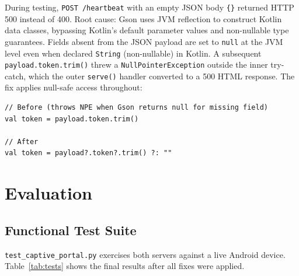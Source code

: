 \documentclass[sigconf,nonacm]{acmart}
\begin{document}
During testing, \texttt{POST /heartbeat} with an empty JSON body
\texttt{\{\}} returned HTTP 500 instead of 400.  Root cause: Gson uses
JVM reflection to construct Kotlin data classes, bypassing Kotlin's
default parameter values and non-nullable type guarantees.  Fields
absent from the JSON payload are set to \texttt{null} at the JVM level
even when declared \texttt{String} (non-nullable) in Kotlin.  A
subsequent \texttt{payload.token.trim()} threw a
\texttt{NullPointerException} outside the inner try-catch, which the
outer \texttt{serve()} handler converted to a 500 HTML response.  The
fix applies null-safe access throughout:

\begin{lstlisting}
// Before (throws NPE when Gson returns null for missing field)
val token = payload.token.trim()

// After
val token = payload?.token?.trim() ?: ""
\end{lstlisting}

\section{Evaluation}

\subsection{Functional Test Suite}

\texttt{test\_captive\_portal.py} exercises both servers against a live
Android device.  Table~\ref{tab:tests} shows the final results after
all fixes were applied.
\end{document}
